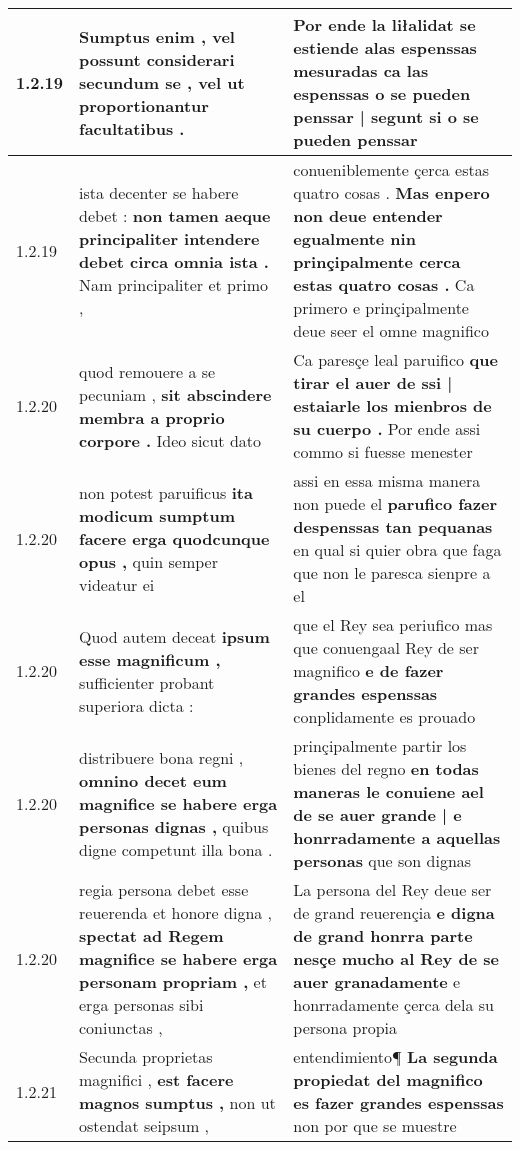 \begin{tabular}{|p{1cm}|p{6.5cm}|p{6.5cm}|}
1.2.19 & Sumptus enim , \textbf{ vel possunt considerari secundum se , } vel ut proportionantur facultatibus . & Por ende la liłalidat se estiende alas espenssas mesuradas \textbf{ ca las espenssas o se pueden penssar | segunt } si o se pueden penssar \\\hline
1.2.19 & ista decenter se habere debet : \textbf{ non tamen aeque principaliter intendere debet circa omnia ista . } Nam principaliter et primo , & conueniblemente çerca estas quatro cosas . \textbf{ Mas enpero non deue entender egualmente nin prinçipalmente cerca estas quatro cosas . } Ca primero e prinçipalmente deue seer el omne magnifico \\\hline
1.2.20 & quod remouere a se pecuniam , \textbf{ sit abscindere membra a proprio corpore . } Ideo sicut dato & Ca paresçe leal paruifico \textbf{ que tirar el auer de ssi | estaiarle los mienbros de su cuerpo . } Por ende assi commo si fuesse menester \\\hline
1.2.20 & non potest paruificus \textbf{ ita modicum sumptum facere erga quodcunque opus , } quin semper videatur ei & assi en essa misma manera non puede el \textbf{ parufico fazer despenssas tan pequanas } en qual si quier obra que faga que non le paresca sienpre a el \\\hline
1.2.20 & Quod autem deceat \textbf{ ipsum esse magnificum , } sufficienter probant superiora dicta : & que el Rey sea periufico mas que conuengaal Rey de ser magnifico \textbf{ e de fazer grandes espenssas } conplidamente es prouado \\\hline
1.2.20 & distribuere bona regni , \textbf{ omnino decet eum magnifice se habere erga personas dignas , } quibus digne competunt illa bona . & prinçipalmente partir los bienes del regno \textbf{ en todas maneras le conuiene ael de se auer grande | e honrradamente a aquellas personas } que son dignas \\\hline
1.2.20 & regia persona debet esse reuerenda et honore digna , \textbf{ spectat ad Regem magnifice se habere erga personam propriam , } et erga personas sibi coniunctas , & La persona del Rey deue ser de grand reuerençia \textbf{ e digna de grand honrra parte nesçe mucho al Rey de se auer granadamente } e honrradamente çerca dela su persona propia \\\hline
1.2.21 & Secunda proprietas magnifici , \textbf{ est facere magnos sumptus , } non ut ostendat seipsum , & entendimiento¶ \textbf{ La segunda propiedat del magnifico es fazer grandes espenssas } non por que se muestre \\\hline

\end{tabular}
